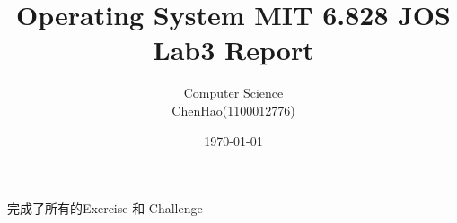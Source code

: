 \documentclass[GBK,winfonts,a4paper,10pt]{ctexart}
\begin{document}
\rhead{}
\lhead{}
\cfoot{\thepage}
\renewcommand{\footrulewidth}{0.4pt}
\renewcommand{\algorithmicrequire}{\textbf{Input:}}
\renewcommand{\algorithmicensure}{\textbf{Output:}}
\setlength{\tabcolsep}{2pt}

\setlength{\parindent}{2em}

\thispagestyle{fancy}


\title{Operating System MIT 6.828 JOS Lab3 Report}
\author{Computer Science \\ ChenHao(1100012776) }
\date{\today}
\maketitle

\thispagestyle{fancy}

\tableofcontents

\newpage


\par
完成了所有的Exercise 和 Challenge
\end{document}
